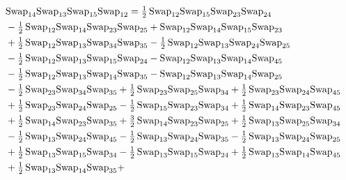 \documentclass[12pt,dvipsnames,accepted=2016-08-18,a4paper,onecolumn]{quantumarticle}
\numberwithin{equation}{section}
\theoremstyle{definition}
\begin{document}
\begin{align*}
        \\
        &\textnormal{Swap}_{14}   \textnormal{Swap}_{13}   \textnormal{Swap}_{15}   \textnormal{Swap}_{12} =  \tfrac12\,\textnormal{Swap}_{12} \textnormal{Swap}_{15} \textnormal{Swap}_{23} \textnormal{Swap}_{24}\\ & - \tfrac12\,\textnormal{Swap}_{12} \textnormal{Swap}_{14} \textnormal{Swap}_{23} \textnormal{Swap}_{25} + \textnormal{Swap}_{12} \textnormal{Swap}_{14} \textnormal{Swap}_{15} \textnormal{Swap}_{23}\\ & +
        \tfrac12\,\textnormal{Swap}_{12} \textnormal{Swap}_{13} \textnormal{Swap}_{34} \textnormal{Swap}_{35} - \tfrac12\,\textnormal{Swap}_{12} \textnormal{Swap}_{13} \textnormal{Swap}_{24} \textnormal{Swap}_{25}\\ & - \tfrac12\,\textnormal{Swap}_{12} \textnormal{Swap}_{13} \textnormal{Swap}_{15} \textnormal{Swap}_{24} -
        \textnormal{Swap}_{12} \textnormal{Swap}_{13} \textnormal{Swap}_{14} \textnormal{Swap}_{45}\\ & - \tfrac12\,\textnormal{Swap}_{12} \textnormal{Swap}_{13} \textnormal{Swap}_{14} \textnormal{Swap}_{35} - \textnormal{Swap}_{12} \textnormal{Swap}_{13} \textnormal{Swap}_{14} \textnormal{Swap}_{25} \\ &-
        \tfrac12\,\textnormal{Swap}_{23} \textnormal{Swap}_{34} \textnormal{Swap}_{35} + \tfrac12\,\textnormal{Swap}_{23} \textnormal{Swap}_{25} \textnormal{Swap}_{34} + \tfrac12\,\textnormal{Swap}_{23} \textnormal{Swap}_{24} \textnormal{Swap}_{45}\\ & + \tfrac12\,\textnormal{Swap}_{23} \textnormal{Swap}_{24} \textnormal{Swap}_{25} -
        \tfrac12\,\textnormal{Swap}_{15} \textnormal{Swap}_{23} \textnormal{Swap}_{34} + \tfrac12\,\textnormal{Swap}_{14} \textnormal{Swap}_{23} \textnormal{Swap}_{45}\\ & + \tfrac12\,\textnormal{Swap}_{14} \textnormal{Swap}_{23} \textnormal{Swap}_{35} + \tfrac32\,\textnormal{Swap}_{14} \textnormal{Swap}_{23} \textnormal{Swap}_{25} +
        \tfrac12\,\textnormal{Swap}_{13} \textnormal{Swap}_{25} \textnormal{Swap}_{34}\\ & - \tfrac12\,\textnormal{Swap}_{13} \textnormal{Swap}_{24} \textnormal{Swap}_{45} - \tfrac12\,\textnormal{Swap}_{13} \textnormal{Swap}_{24} \textnormal{Swap}_{35} - \tfrac12\,\textnormal{Swap}_{13} \textnormal{Swap}_{24} \textnormal{Swap}_{25}\\ & +
        \tfrac12\,\textnormal{Swap}_{13} \textnormal{Swap}_{15} \textnormal{Swap}_{34} - \tfrac12\,\textnormal{Swap}_{13} \textnormal{Swap}_{15} \textnormal{Swap}_{24} + \tfrac12\,\textnormal{Swap}_{13} \textnormal{Swap}_{14} \textnormal{Swap}_{45}\\ & + \tfrac12\,\textnormal{Swap}_{13} \textnormal{Swap}_{14} \textnormal{Swap}_{35} +

\end{align*}
\end{document}
